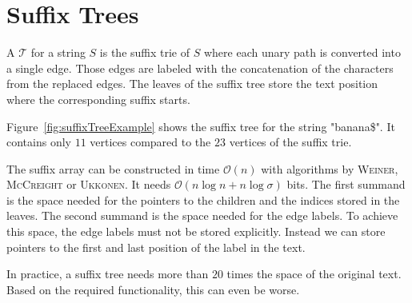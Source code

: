 \section{Suffix Trees}

\begin{Definition}
  A  $\mathcal{T}$ for a string $S$ is the suffix trie of $S$ where each unary path is converted into a single edge. Those edges are labeled with the concatenation of the characters from the replaced edges. The leaves of the suffix tree store the text position where the corresponding suffix starts.
\end{Definition}

\begin{Example}
  Figure~\ref{fig:suffixTreeExample} shows the suffix tree for the string "banana\$". It contains only $11$ vertices compared to the $23$ vertices of the suffix trie.
\end{Example}

The suffix array can be constructed in time $\mathcal{O}(n)$ with algorithms by \textsc{Weiner}\cite{Weiner1973}, \textsc{McCreight}\cite{McCreight1976} or \textsc{Ukkonen}\cite{Ukkonen1995}. It needs $\mathcal{O}(n\log n + n\log \sigma)$ bits. The first summand is the space needed for the pointers to the children and the indices stored in the leaves. The second summand is the space needed for the edge labels. To achieve this space, the edge labels must not be stored explicitly. Instead we can store pointers to the first and last position of the label in the text.

In practice, a suffix tree needs more than $20$ times the space of the original text. Based on the required functionality, this can even be worse.
